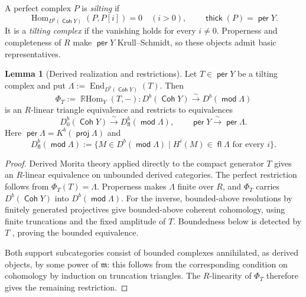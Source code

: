 \documentclass[a4paper,reqno]{amsart}
\def\m{\mathfrak{m}}
\DeclareMathOperator{\md}{\mathsf{mod}}
\renewcommand{\mod}{\md}
\DeclareMathOperator{\proj}{\mathsf{proj}}
\DeclareMathOperator{\fl}{\mathsf{fl}}
\DeclareMathOperator{\Coh}{\mathsf{Coh}}
\DeclareMathOperator{\per}{\mathsf{per}}
\DeclareMathOperator{\thick}{\mathsf{thick}}
\DeclareMathOperator{\Hom}{Hom}
\DeclareMathOperator{\End}{End}
\DeclareMathOperator{\RHom}{\mathbb{R}Hom}
\theoremstyle{definition}
\newtheorem{Lem}[Thm]{Lemma}
\begin{document}
A perfect complex $P$ is \emph{silting} if
\[
\Hom_{D^b(\Coh Y)}(P,P[i])=0\quad(i>0),
\qquad \thick(P)=\per Y.
\]
It is a \emph{tilting complex} if the vanishing holds for every $i\ne0$. Properness and completeness of $R$ make $\per Y$ Krull--Schmidt, so these objects admit basic representatives.

\begin{Lem}[Derived realization and restrictions]\label{lem:tilting-derived-realization}
Let $T\in\per Y$ be a tilting complex and put $\Lambda:=\End_{D^b(\Coh Y)}(T)$. Then
\[
\Phi_T:=\RHom_Y(T,-)\colon
D^b(\Coh Y)\xrightarrow{\ \sim\ }D^b(\mod\Lambda)
\]
is an $R$-linear triangle equivalence and restricts to equivalences
\begin{equation}\label{eq:tilting-derived-restrictions}
D^b_0(\Coh Y)\xrightarrow{\ \sim\ }D^b_{\fl}(\mod\Lambda),
\qquad
\per Y\xrightarrow{\ \sim\ }\per\Lambda.
\end{equation}
Here $\per\Lambda=K^b(\proj\Lambda)$ and
\[
D^b_{\fl}(\mod\Lambda):=
\{M\in D^b(\mod\Lambda)\mid H^i(M)\in\fl\Lambda\text{ for every }i\}.
\]
\end{Lem}
\begin{proof}
Derived Morita theory \cite{Kel94} applied directly to the compact generator $T$ gives an $R$-linear equivalence on unbounded derived categories. The perfect restriction follows from $\Phi_T(T)=\Lambda$. Properness makes $\Lambda$ finite over $R$, and $\Phi_T$ carries $D^b(\Coh Y)$ into $D^b(\mod\Lambda)$. For the inverse, bounded-above resolutions by finitely generated projectives give bounded-above coherent cohomology, using finite truncations and the fixed amplitude of $T$. Boundedness below is detected by $T$ \cite[Tag 0GEQ]{stacks-project}, proving the bounded equivalence.

Both support subcategories consist of bounded complexes annihilated, as derived objects, by some power of $\m$: this follows from the corresponding condition on cohomology by induction on truncation triangles. The $R$-linearity of $\Phi_T$ therefore gives the remaining restriction.
\end{proof}
\end{document}
